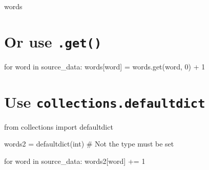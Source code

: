 \documentclass[
  letterpaper,
  DIV=11,
  numbers=noendperiod]{scrreprt}
\newenvironment{Shaded}{\begin{snugshade}}{\end{snugshade}}
\newcommand{\BuiltInTok}[1]{\textcolor[rgb]{0.00,0.23,0.31}{#1}}
\newcommand{\CommentTok}[1]{\textcolor[rgb]{0.37,0.37,0.37}{#1}}
\newcommand{\ControlFlowTok}[1]{\textcolor[rgb]{0.00,0.23,0.31}{#1}}
\newcommand{\DecValTok}[1]{\textcolor[rgb]{0.68,0.00,0.00}{#1}}
\newcommand{\ImportTok}[1]{\textcolor[rgb]{0.00,0.46,0.62}{#1}}
\newcommand{\KeywordTok}[1]{\textcolor[rgb]{0.00,0.23,0.31}{#1}}
\newcommand{\NormalTok}[1]{\textcolor[rgb]{0.00,0.23,0.31}{#1}}
\newcommand{\OperatorTok}[1]{\textcolor[rgb]{0.37,0.37,0.37}{#1}}
\begin{document}
\begin{Shaded}
\begin{Highlighting}[]
\NormalTok{words}
\end{Highlighting}
\end{Shaded}

\hypertarget{or-use-.get-1}{%
\section{\texorpdfstring{Or use
\texttt{.get()}}{Or use .get()}}\label{or-use-.get-1}}

\begin{Shaded}
\begin{Highlighting}[]
\ControlFlowTok{for}\NormalTok{ word }\KeywordTok{in}\NormalTok{ source\_data:}
\NormalTok{    words[word] }\OperatorTok{=}\NormalTok{ words.get(word, }\DecValTok{0}\NormalTok{) }\OperatorTok{+} \DecValTok{1}
\end{Highlighting}
\end{Shaded}

\hypertarget{use-collections.defaultdict-1}{%
\section{\texorpdfstring{Use
\texttt{collections.defaultdict}}{Use collections.defaultdict}}\label{use-collections.defaultdict-1}}

\begin{Shaded}
\begin{Highlighting}[]
\ImportTok{from}\NormalTok{ collections }\ImportTok{import}\NormalTok{ defaultdict}
\end{Highlighting}
\end{Shaded}

\begin{Shaded}
\begin{Highlighting}[]
\NormalTok{words2 }\OperatorTok{=}\NormalTok{ defaultdict(}\BuiltInTok{int}\NormalTok{) }\CommentTok{\# Not the type must be set}
\end{Highlighting}
\end{Shaded}

\begin{Shaded}
\begin{Highlighting}[]
\ControlFlowTok{for}\NormalTok{ word }\KeywordTok{in}\NormalTok{ source\_data:}
\NormalTok{    words2[word] }\OperatorTok{+=} \DecValTok{1}
\end{Highlighting}
\end{Shaded}
\end{document}
